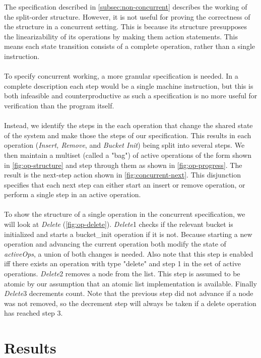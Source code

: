 \documentclass{uit-thesis}
\begin{document}
The specification described in \autoref{subsec:non-concurrent} describes the working of the split-order structure. However, it is not useful for proving the correctness of the structure in a concurrent setting. This is because its structure presupposes the linearizability of its operations by making them action statements. This means each state transition consists of a complete operation, rather than a single instruction.
\\\\
To specify concurrent working, a more granular specification is needed. In a complete description each step would be a single machine instruction, but this is both infeasible and counterproductive as such a specification is no more useful for verification than the program itself.
\\\\
Instead, we identify the steps in the each operation that change the shared state of the system and make those the steps of our specification. This results in each operation (\textit{Insert, Remove}, and \textit{Bucket Init}) being split into several steps. We then maintain a multiset (called a "bag") of active operations of the form shown in \autoref{fig:op-structure} and step through them as shown in \autoref{fig:op-progress}. The result is the next-step action shown in \autoref{fig:concurrent-next}. This disjunction specifies that each next step can either start an insert or remove operation, or perform a single step in an active operation.
\\\\
To show the structure of a single operation in the concurrent specification, we will look at \textit{Delete} (\autoref{fig:op-delete}). \textit{Delete}1 checks if the relevant bucket is initialized and starts a bucket\_init operation if it is not. Because starting a new operation and advancing the current operation both modify the state of \textit{activeOps}, a union of both changes is needed. Also note that this step is enabled iff there exists an operation with type "delete" and step 1 in the set of active operations. \textit{Delete}2 removes a node from the list. This step is assumed to be atomic by our assumption that an atomic list implementation is available. Finally \textit{Delete}3 decrements count. Note that the previous step did not advance if a node was not removed, so the decrement step will always be taken if a delete operation has reached step 3.

\chapter{Results}\label{ch:results}
\end{document}
